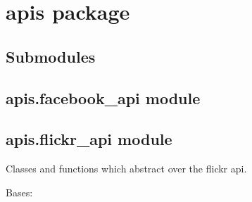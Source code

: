 \documentclass[letterpaper,10pt,english]{sphinxmanual}
\begin{document}
\section{apis package}
\label{apis:apis-package}\label{apis::doc}

\subsection{Submodules}
\label{apis:submodules}

\subsection{apis.facebook\_api module}
\label{apis:apis-facebook-api-module}\label{apis:module-apis.facebook_api}

\subsection{apis.flickr\_api module}
\label{apis:module-apis.flickr_api}\label{apis:apis-flickr-api-module}
Classes and functions which abstract over the flickr api.

\begin{fulllineitems}
\label{apis:apis.flickr_api.FlickrQuery}
Bases: {\hyperref[apis:apis.Query]{\emph{}}}

\end{fulllineitems}

\end{document}
